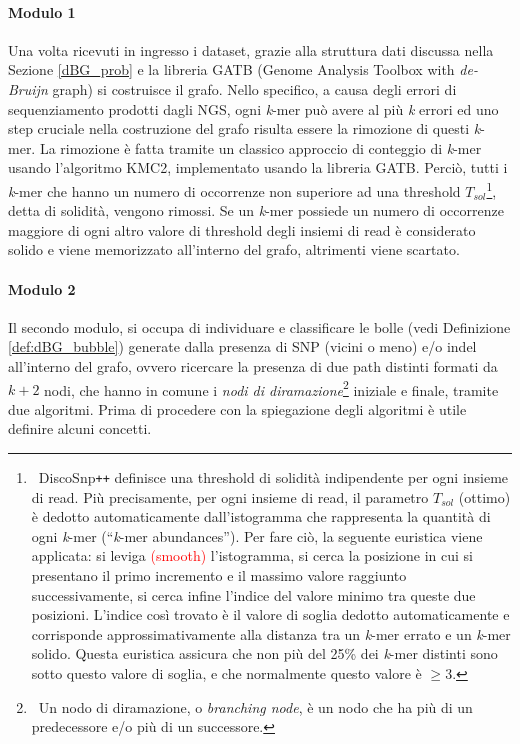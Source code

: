 \documentclass[../main.tex]{subfiles}
\begin{document}
\paragraph{Modulo 1} Una volta ricevuti in ingresso i dataset, grazie alla struttura dati discussa nella Sezione \ref{dBG_prob} e la libreria GATB (Genome Analysis Toolbox with \textit{de-Bruijn} graph) si costruisce il grafo. Nello specifico, a causa degli errori di sequenziamento prodotti dagli NGS, ogni \textit{k}-mer può avere al più \textit{k} errori ed uno step cruciale nella costruzione del grafo risulta essere la rimozione di questi \textit{k}-mer. La rimozione è fatta tramite un classico approccio di conteggio di \textit{k}-mer usando l'algoritmo KMC2, implementato usando la libreria GATB. Perciò, tutti i \textit{k}-mer che hanno un numero di occorrenze non superiore ad una threshold $T_{sol}$\footnote{\ DiscoSnp\texttt{++} definisce una threshold di solidità indipendente per ogni insieme di read. Più precisamente, per ogni insieme di read, il parametro $T_{sol}$ (ottimo) è dedotto automaticamente dall'istogramma che rappresenta la quantità di ogni \textit{k}-mer (``\textit{k}-mer abundances''). Per fare ciò, la seguente euristica viene applicata: si leviga  \textcolor{red}{(smooth)} l'istogramma, si cerca la posizione in cui si presentano il primo incremento e il massimo valore raggiunto successivamente, si cerca infine l'indice del valore minimo tra queste due posizioni. L'indice così trovato è il valore di soglia dedotto automaticamente e corrisponde approssimativamente alla distanza tra un \textit{k}-mer errato e un \textit{k}-mer solido. Questa euristica assicura che non più del 25\% dei \textit{k}-mer distinti sono sotto questo valore di soglia, e che normalmente questo valore è $\geq3$.}, detta di solidità, vengono rimossi. Se  un \textit{k}-mer possiede un numero di occorrenze maggiore di ogni altro valore di threshold degli insiemi di read è considerato solido e viene memorizzato all'interno del grafo, altrimenti viene scartato.

\paragraph{Modulo 2} Il secondo modulo, si occupa di individuare e classificare le bolle (vedi Definizione \ref{def:dBG_bubble}) generate dalla presenza di SNP (vicini o meno) e/o indel all'interno del grafo, ovvero ricercare la presenza di due path distinti formati da $k+2$ nodi, che hanno in comune i \textit{nodi di diramazione}\footnote{\ Un nodo di diramazione, o \textit{branching node}, è un nodo che ha più di un predecessore e/o più di un successore.} iniziale e finale, tramite due algoritmi. Prima di procedere con la spiegazione degli algoritmi è utile definire alcuni concetti.
\end{document}
